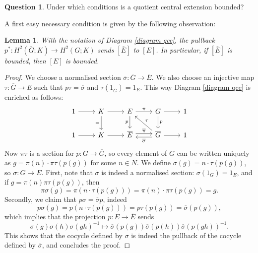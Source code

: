 \documentclass[svgnames]{amsart}
\theoremstyle{plain}
\newtheorem{lemma}[thm]{Lemma}
\theoremstyle{definition}
\newtheorem{question}[thm]{Question}
\begin{document}
\begin{question}
\label{question qce}
    Under which conditions is a quotient central extension bounded?
\end{question}

A first easy necessary condition is given by the following observation:

\begin{lemma}
\label{qce pullback}
    With the notation of Diagram \eqref{diagram qce}, the pullback $p^* \colon H^2(\overline{G}; K) \to H^2(G; K)$ sends $[\overline{E}]$ to $[E]$. In particular, if $[\overline{E}]$ is bounded, then $[E]$ is bounded.
\end{lemma}

\begin{proof}
    We choose a normalised section $\overline \sigma \colon \overline G \to \overline E$. We also choose an injective map $\tau \colon \overline G \to E$ such that $p \tau = \overline \sigma$ and $\tau(1_{\overline{G}}) = 1_E$. This way Diagram \eqref{diagram qce} is enriched as follows:
\[\begin{tikzcd}
	1 & K & E & G & 1 \\
	1 & K & {\overline{E}} & {\overline{G}} & 1
	\arrow[from=1-1, to=1-2]
	\arrow[from=1-2, to=1-3]
	\arrow["{=}"', from=1-2, to=2-2]
	\arrow["\pi", from=1-3, to=1-4]
	\arrow["p"', from=1-3, to=2-3]
	\arrow[from=1-4, to=1-5]
	\arrow["p", from=1-4, to=2-4]
	\arrow[from=2-1, to=2-2]
	\arrow[from=2-2, to=2-3]
	\arrow["{\overline \pi}", shift left, from=2-3, to=2-4]
	\arrow["\tau"', from=2-4, to=1-3]
	\arrow["{\overline\sigma}", shift left, from=2-4, to=2-3]
	\arrow[from=2-4, to=2-5]
\end{tikzcd}\]
    Now $\pi \tau$ is a section for $p \colon G \to \overline G$, so every element of $G$ can be written uniquely as $g = \pi(n) \cdot \pi \tau(p(g))$ for some $n\in N$. We define $\sigma(g) = n \cdot \tau(p(g))$, so $\sigma \colon G \to E$.
    First, note that $\sigma$ is indeed a normalised section: $\sigma(1_G) = 1_E$, and if $g = \pi(n) \pi \tau (p(g))$, then
    \[\pi\sigma(g) = \pi(n \cdot \tau(p(g))) = \pi(n) \cdot \pi \tau(p(g)) = g.\]
    Secondly, we claim that $p \sigma = \overline \sigma p$, indeed
    \[p\sigma(g) = p(n \cdot \tau(p(g))) = p\tau(p(g)) = \overline \sigma(p(g)),\]
    which implies that the projection $p \colon E \to \overline E$ sends
    \[\sigma(g)\sigma(h)\sigma(gh)^{-1} \mapsto \overline \sigma(p(g)) \overline \sigma(p(h)) \overline \sigma(p(gh))^{-1}.\]
    This shows that the cocycle defined by $\sigma$ is indeed the pullback of the cocycle defined by $\overline \sigma$, and concludes the proof.
\end{proof}
\end{document}
